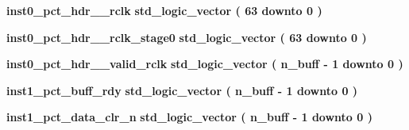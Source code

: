 \begin{DoxyCompactItemize}
\item 
{\bf inst0\+\_\+pct\+\_\+hdr\+\_\+\_\+rclk} {\bfseries \textcolor{comment}{std\+\_\+logic\+\_\+vector}\textcolor{vhdlchar}{ }\textcolor{vhdlchar}{(}\textcolor{vhdlchar}{ }\textcolor{vhdlchar}{ } \textcolor{vhdldigit}{63} \textcolor{vhdlchar}{ }\textcolor{keywordflow}{downto}\textcolor{vhdlchar}{ }\textcolor{vhdlchar}{ } \textcolor{vhdldigit}{0} \textcolor{vhdlchar}{ }\textcolor{vhdlchar}{)}\textcolor{vhdlchar}{ }} 
\item 
{\bf inst0\+\_\+pct\+\_\+hdr\+\_\+\_\+rclk\+\_\+stage0} {\bfseries \textcolor{comment}{std\+\_\+logic\+\_\+vector}\textcolor{vhdlchar}{ }\textcolor{vhdlchar}{(}\textcolor{vhdlchar}{ }\textcolor{vhdlchar}{ } \textcolor{vhdldigit}{63} \textcolor{vhdlchar}{ }\textcolor{keywordflow}{downto}\textcolor{vhdlchar}{ }\textcolor{vhdlchar}{ } \textcolor{vhdldigit}{0} \textcolor{vhdlchar}{ }\textcolor{vhdlchar}{)}\textcolor{vhdlchar}{ }} 
\item 
{\bf inst0\+\_\+pct\+\_\+hdr\+\_\+\_\+valid\+\_\+rclk} {\bfseries \textcolor{comment}{std\+\_\+logic\+\_\+vector}\textcolor{vhdlchar}{ }\textcolor{vhdlchar}{(}\textcolor{vhdlchar}{ }\textcolor{vhdlchar}{ }\textcolor{vhdlchar}{ }\textcolor{vhdlchar}{ }{\bfseries {\bf n\+\_\+buff}} \textcolor{vhdlchar}{-\/}\textcolor{vhdlchar}{ } \textcolor{vhdldigit}{1} \textcolor{vhdlchar}{ }\textcolor{keywordflow}{downto}\textcolor{vhdlchar}{ }\textcolor{vhdlchar}{ } \textcolor{vhdldigit}{0} \textcolor{vhdlchar}{ }\textcolor{vhdlchar}{)}\textcolor{vhdlchar}{ }} 
\item 
{\bf inst1\+\_\+pct\+\_\+buff\+\_\+rdy} {\bfseries \textcolor{comment}{std\+\_\+logic\+\_\+vector}\textcolor{vhdlchar}{ }\textcolor{vhdlchar}{(}\textcolor{vhdlchar}{ }\textcolor{vhdlchar}{ }\textcolor{vhdlchar}{ }\textcolor{vhdlchar}{ }{\bfseries {\bf n\+\_\+buff}} \textcolor{vhdlchar}{-\/}\textcolor{vhdlchar}{ } \textcolor{vhdldigit}{1} \textcolor{vhdlchar}{ }\textcolor{keywordflow}{downto}\textcolor{vhdlchar}{ }\textcolor{vhdlchar}{ } \textcolor{vhdldigit}{0} \textcolor{vhdlchar}{ }\textcolor{vhdlchar}{)}\textcolor{vhdlchar}{ }} 
\item 
{\bf inst1\+\_\+pct\+\_\+data\+\_\+clr\+\_\+n} {\bfseries \textcolor{comment}{std\+\_\+logic\+\_\+vector}\textcolor{vhdlchar}{ }\textcolor{vhdlchar}{(}\textcolor{vhdlchar}{ }\textcolor{vhdlchar}{ }\textcolor{vhdlchar}{ }\textcolor{vhdlchar}{ }{\bfseries {\bf n\+\_\+buff}} \textcolor{vhdlchar}{-\/}\textcolor{vhdlchar}{ } \textcolor{vhdldigit}{1} \textcolor{vhdlchar}{ }\textcolor{keywordflow}{downto}\textcolor{vhdlchar}{ }\textcolor{vhdlchar}{ } \textcolor{vhdldigit}{0} \textcolor{vhdlchar}{ }\textcolor{vhdlchar}{)}\textcolor{vhdlchar}{ }} 

\end{DoxyCompactItemize}
